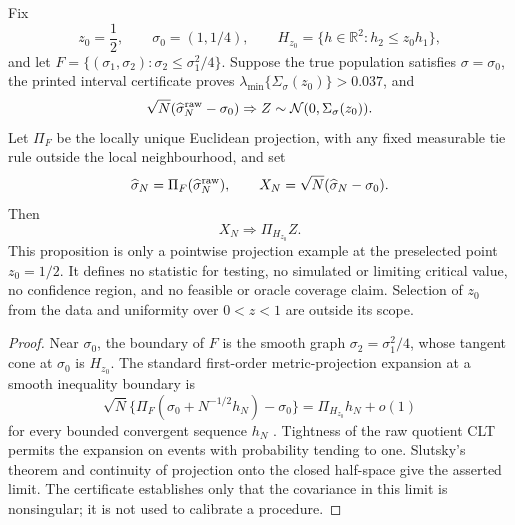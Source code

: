 \begin{proposition}\label{thm:e-fixed-candidate-exchange-diagonal-main}
Fix
\[
z_0=\frac12,\qquad \sigma_0=(1,1/4),\qquad
H_{z_0}=\{h\in\mathbb R^2:h_2\le z_0h_1\},
\]
and let \(F=\{(\sigma_1,\sigma_2):\sigma_2\le\sigma_1^2/4\}\).  Suppose the
true population satisfies \(\sigma=\sigma_0\), the printed interval
certificate proves
\(\lambda_{\min}\{\Sigma_\sigma(z_0)\}>0.037\), and
\[
\sqrt N(\widehat\sigma_N^{\rm raw}-\sigma_0)
\Rightarrow Z\sim\mathcal N(0,\Sigma_\sigma(z_0)).
\]
Let \(\Pi_F\) be the locally unique Euclidean projection, with any fixed
measurable tie rule outside the local neighbourhood, and set
\[
\widehat\sigma_N=\Pi_F(\widehat\sigma_N^{\rm raw}),\qquad
X_N=\sqrt N(\widehat\sigma_N-\sigma_0).
\]
Then
\[
X_N\Rightarrow \Pi_{H_{z_0}}Z .
\]
This proposition is only a pointwise projection example at the preselected point
\(z_0=1/2\).  It defines no statistic for testing, no simulated or limiting
critical value, no confidence region, and no feasible or oracle coverage
claim.  Selection of \(z_0\) from the data and uniformity over \(0<z<1\) are
outside its scope.
\end{proposition}

\begin{proof}
Near \(\sigma_0\), the boundary of \(F\) is the smooth graph
\(\sigma_2=\sigma_1^2/4\), whose tangent cone at \(\sigma_0\) is
\(H_{z_0}\).  The standard first-order metric-projection expansion at a smooth
inequality boundary is
\[
\sqrt N\{\Pi_F(\sigma_0+N^{-1/2}h_N)-\sigma_0\}
=\Pi_{H_{z_0}}h_N+o(1)
\]
for every bounded convergent sequence \(h_N\)
\cite{Shapiro1987MetricProjection}.  Tightness of the raw quotient CLT permits
the expansion on events with probability tending to one.  Slutsky's theorem
and continuity of projection onto the closed half-space give the asserted
limit.  The certificate establishes only that the covariance in this limit is
nonsingular; it is not used to calibrate a procedure.
\end{proof}

